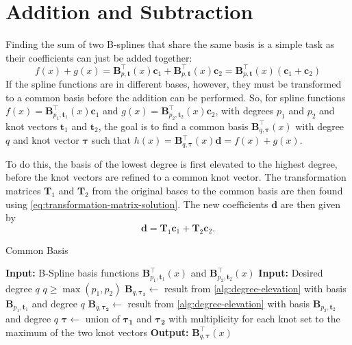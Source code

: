 \section{Addition and Subtraction}
Finding the sum of two B-splines that share the same basis is a simple task as their coefficients can just be added together:
\begin{equation}
    f(x) + g(x) =  \mathbf{B}_{p, \mathbf{t}}^{\top}(x) \mathbf{c}_1 + \mathbf{B}_{p, \mathbf{t}}^{\top}(x) \mathbf{c}_2
    = \mathbf{B}_{p, \mathbf{t}}^{\top}(x)(\mathbf{c}_1 + \mathbf{c}_2)
\end{equation}
If the spline functions are in different bases, however, they must be transformed to a common basis before the addition can be performed. So, for spline functions $f(x) = \mathbf{B}_{p_1, \mathbf{t}_1}^{\top}(x) \mathbf{c}_1$ and $g(x) = \mathbf{B}_{p_2, \mathbf{t}_2}^{\top}(x) \mathbf{c}_2$, with degrees $p_1$ and $p_2$ and knot vectors $\mathbf{t}_1$ and $\mathbf{t}_2$, the goal is to find a common basis $\mathbf{B}_{q, \boldsymbol{\tau}}^{\top}(x)$ with degree $q$ and knot vector $\boldsymbol{\tau}$ such that $h(x) = \mathbf{B}_{q, \boldsymbol{\tau}}^{\top}(x) \mathbf{d} = f(x) + g(x)$.

To do this, the basis of the lowest degree is first elevated to the highest degree, before the knot vectors are refined to a common knot vector. The transformation matrices $\mathbf T_1$ and $\mathbf T_2$ from the original bases to the common basis are then found using \cref{eq:transformation-matrix-solution}. The new coefficients $\mathbf d$ are then given by
\begin{equation}
    \mathbf d = \mathbf T_1 \mathbf c_1 + \mathbf T_2 \mathbf c_2.
\end{equation}

\begin{algorithm}
    \caption{Common Basis}\label{alg:common-basis}
    \begin{algorithmic}
        \State \textbf{Input:} B-Spline basis functions $\mathbf{B}_{p_1, \mathbf{t}_1}^{\top}(x)$ and $\mathbf{B}_{p_2, \mathbf{t}_2}^{\top}(x)$
        \State \textbf{Input:} Desired degree $q$
        \Ensure $q \geq \max(p_1, p_2)$
        \State $\mathbf B_{q, \boldsymbol{\tau_1}} \gets$ result from \cref{alg:degree-elevation} with basis $\mathbf{B}_{p_1, \mathbf{t}_1}$ and degree $q$
        \State $\mathbf B_{q, \boldsymbol{\tau_2}} \gets$ result from \cref{alg:degree-elevation} with basis $\mathbf{B}_{p_2, \mathbf{t}_2}$ and degree $q$
        \State $\boldsymbol{\tau} \gets$ union of $\boldsymbol{\tau_1}$ and $\boldsymbol{\tau_2}$ with multiplicity for each knot set to the maximum of the two knot vectors
        \State \textbf{Output:} $\mathbf B_{q, \boldsymbol{\tau}}^{\top}(x)$
    \end{algorithmic}
\end{algorithm}


